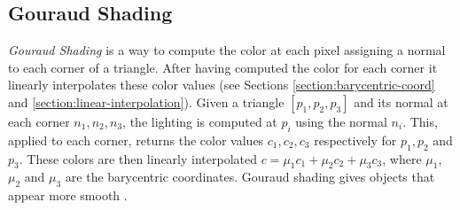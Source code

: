 \subsection{Gouraud Shading}
\textit{Gouraud Shading} is a way to compute the color at each pixel assigning a normal to each corner of a triangle. After having computed the color for each corner it linearly interpolates these color values (see Sections \ref{section:barycentric-coord} and \ref{section:linear-interpolation}).
Given a triangle $[p_1, p_2, p_3]$ and its normal at each corner $n_1, n_2, n_3$, the lighting is computed at $p_i$ using the normal $n_i$. This, applied to each corner, returns the color values $c_1, c_2, c_3$ respectively for $p_1, p_2$ and $p_3$.
These colors are then linearly interpolated $c = {\mu}_1 c_1 + {\mu}_2 c_2 + {\mu}_3 c_3$, where ${\mu}_1$, ${\mu}_2$ and ${\mu}_3$ are the barycentric coordinates. Gouraud shading gives objects that appear more smooth \cite{SLIDE:ICORSI}.



